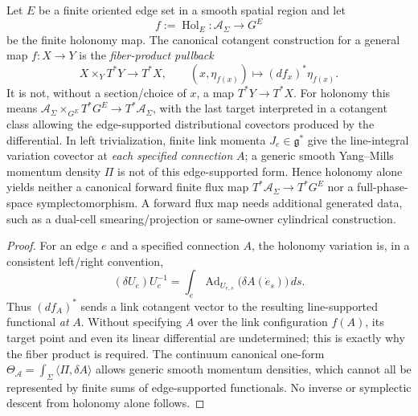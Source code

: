 \documentclass[12pt,a4paper]{article}
\begin{document}
\begin{proposition}
\label{p10:prop:v2159-holonomy-cotangent-firewall}
Let \(E\) be a finite oriented edge set in a smooth spatial region and let
\[
 f:=\operatorname{Hol}_E:\mathcal A_\Sigma\longrightarrow G^E
\]
be the finite holonomy map. The canonical cotangent construction for a
general map \(f:X\to Y\) is the \emph{fiber-product pullback}
\[
 \boxed{X\times_{Y}T^*Y\longrightarrow T^*X,\qquad
 (x,\eta_{f(x)})\longmapsto (df_x)^*\eta_{f(x)}.}
\]
It is not, without a section/choice of \(x\), a map
\(T^*Y\to T^*X\). For holonomy this means
\(\mathcal A_\Sigma\times_{G^E}T^*G^E\to T^*\mathcal A_\Sigma\),
with the last target interpreted in a cotangent class allowing the
edge-supported distributional covectors produced by the differential.
In left trivialization, finite link momenta
\(J_e\in\mathfrak g^*\) give the line-integral variation covector at
\emph{each specified connection} \(A\); a generic smooth Yang--Mills
momentum density \(\Pi\) is not of this edge-supported form. Hence
holonomy alone yields neither a canonical forward finite flux map
\(T^*\mathcal A_\Sigma\to T^*G^E\) nor a full-phase-space
symplectomorphism. A forward flux map needs additional generated data,
such as a dual-cell smearing/projection or same-owner cylindrical
construction.
\end{proposition}
\begin{proof}
For an edge \(e\) and a specified connection \(A\), the holonomy
variation is, in a consistent left/right convention,
\[
 (\delta U_e)U_e^{-1}
 =\int_e\operatorname{Ad}_{U_{e,s}}\!\bigl(\delta A(\dot e_s)\bigr)\,ds.
\]
Thus \((df_A)^*\) sends a link cotangent vector to the resulting
line-supported functional \emph{at} \(A\). Without specifying \(A\)
over the link configuration \(f(A)\), its target point and even its
linear differential are undetermined; this is exactly why the fiber
product is required. The continuum canonical one-form
\(\Theta_{\mathcal A}=\int_\Sigma\langle\Pi,\delta A\rangle\)
allows generic smooth momentum densities, which cannot all be represented
by finite sums of edge-supported functionals. No inverse or symplectic
descent from holonomy alone follows.
\end{proof}
\end{document}
